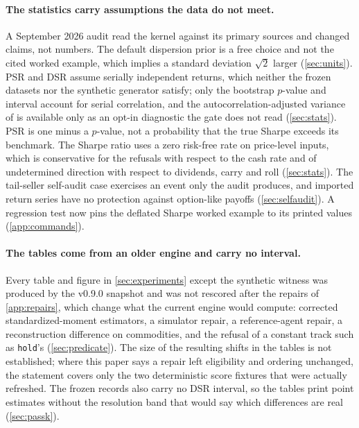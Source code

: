 \paragraph{The statistics carry assumptions the data do not meet.} A September 2026 audit read the kernel against its primary sources and changed claims, not numbers. The default dispersion prior is a free choice and not the cited worked example, which implies a standard deviation $\sqrt{2}$ larger (\cref{sec:units}). PSR and DSR assume serially independent returns, which neither the frozen datasets nor the synthetic generator satisfy; only the bootstrap $p$-value and interval account for serial correlation, and the autocorrelation-adjusted variance of \citet{lopezdeprado2026howto} is available only as an opt-in diagnostic the gate does not read (\cref{sec:stats}). PSR is one minus a $p$-value, not a probability that the true Sharpe exceeds its benchmark. The Sharpe ratio uses a zero risk-free rate on price-level inputs, which is conservative for the refusals with respect to the cash rate and of undetermined direction with respect to dividends, carry and roll (\cref{sec:stats}). The tail-seller self-audit case exercises an event only the audit produces, and imported return series have no protection against option-like payoffs (\cref{sec:selfaudit}). A regression test now pins the deflated Sharpe worked example to its printed values (\cref{app:commands}).

\paragraph{The tables come from an older engine and carry no interval.} Every table and figure in \cref{sec:experiments} except the synthetic witness was produced by the v0.9.0 snapshot and was not rescored after the repairs of \cref{app:repairs}, which change what the current engine would compute: corrected standardized-moment estimators, a simulator repair, a reference-agent repair, a reconstruction difference on commodities, and the refusal of a constant track such as \texttt{hold}'s (\cref{sec:predicate}). The size of the resulting shifts in the tables is not established; where this paper says a repair left eligibility and ordering unchanged, the statement covers only the two deterministic score fixtures that were actually refreshed. The frozen records also carry no DSR interval, so the tables print point estimates without the resolution band that would say which differences are real (\cref{sec:passk}).

